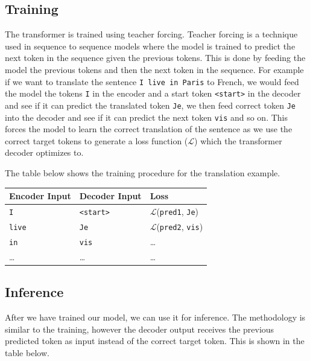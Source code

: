 \documentclass[../main.tex]{subfiles}
\begin{document}
\subsection{Training}

The transformer is trained using teacher forcing. Teacher forcing is a technique used in sequence to sequence models where the model is trained to predict the next token in the sequence given the previous tokens. This is done by feeding the model the previous tokens and then the next token in the sequence. For example if we want to translate the sentence \texttt{I live in Paris} to French, we would feed the model the tokens \texttt{I} in the encoder and a start token \texttt{<start>} in the decoder and see if it can predict the translated token \texttt{Je}, we then feed correct token \texttt{Je} into the decoder and see if it can predict the next token \texttt{vis} and so on. This forces the model to learn the correct translation of the sentence as we use the correct target tokens to generate a loss function ($\mathcal{L}$) which the transformer decoder optimizes to.

The table below shows the training procedure for the translation example. 

\begin{table}[H]
	\centering
	\begin{tabular}{lll}
	\toprule
	{Encoder Input} & {Decoder Input} & {Loss} \\
	\midrule
	\texttt{I}                     & \texttt{<start>} & $\mathcal{L}$(\texttt{pred1}, \texttt{Je}) \\
	\texttt{live}                  & \texttt{Je}                     & $\mathcal{L}$(\texttt{pred2}, \texttt{vis}) \\
	\texttt{in}                    & \texttt{vis}                    & \ldots \\
	\ldots                & \ldots                 & \ldots \\
	\bottomrule
	\end{tabular}
	\end{table}

\subsection{Inference}

After we have trained our model, we can use it for inference. The methodology is similar to the training, however the decoder output receives the previous predicted token as input instead of the correct target token. This is shown in the table below.
\end{document}
